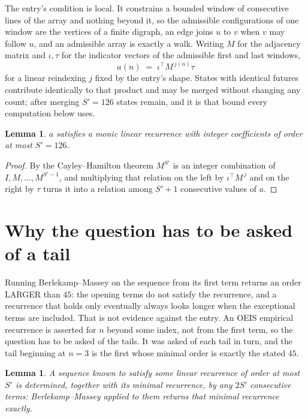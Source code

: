 \documentclass[11pt,a4paper]{article}
\theoremstyle{plain}
\newtheorem{lemma}[theorem]{Lemma}
\theoremstyle{definition}
\begin{document}
The entry's condition is local. It constrains a bounded window of consecutive lines of the
array and nothing beyond it, so the admissible configurations of one window are the vertices of
a finite digraph, an edge joins $u$ to $v$ when $v$ may follow $u$, and an admissible array is
exactly a walk. Writing $M$ for the adjacency matrix and $\iota,\tau$ for the indicator vectors
of the admissible first and last windows,
\[
a(n)\;=\;\iota^{\!\top}M^{\,j(n)}\tau
\]
for a linear reindexing $j$ fixed by the entry's shape. States with identical futures
contribute identically to that product and may be merged without changing any count; after
merging $S'=126$ states remain, and it is that bound every computation below uses.

\begin{lemma}\label{lem:cf}
$a$ satisfies a monic linear recurrence with integer coefficients of order at most $S'=126$.
\end{lemma}

\begin{proof}
By the Cayley--Hamilton theorem $M^{S'}$ is an integer combination of $I,M,\dots,M^{S'-1}$,
and multiplying that relation on the left by $\iota^{\!\top}M^{\,j}$ and on the right by
$\tau$ turns it into a relation among $S'+1$ consecutive values of $a$.
\end{proof}

\section{Why the question has to be asked of a tail}

Running Berlekamp--Massey on the sequence from its first term returns an order LARGER than $45$: the opening terms do not satisfy the recurrence, and a recurrence that holds only eventually always looks longer when the exceptional terms are included. That is not evidence against the entry. An OEIS empirical recurrence is asserted for $n$ beyond some index, not from the first term, so the question has to be asked of the tails. It was asked of each tail in turn, and the tail beginning at $n=3$ is the first whose minimal order is exactly the stated $45$.

\begin{lemma}\label{lem:bm}
A sequence known to satisfy some linear recurrence of order at most $S'$ is determined,
together with its minimal recurrence, by any $2S'$ consecutive terms: Berlekamp--Massey applied
to them returns that minimal recurrence exactly.
\end{lemma}
\end{document}
